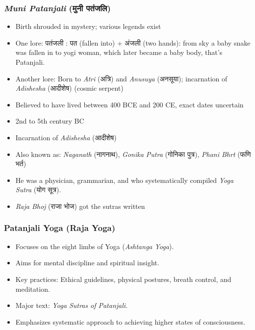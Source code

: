 \begin{frame}[fragile]\frametitle{\textit{Muni Patanjali} (मुनी पतंजलि)}

    \begin{itemize}
        \item Birth shrouded in mystery; various legends exist
		\item One lore: पतंजली : पत (fallen into) + अंजली (two hands): from sky a baby snake was fallen in to yogi woman, which later became a baby body, that's Patanjali.
        \item Another lore: Born to \textit{Atri} (अत्रि) and \textit{Anusuya} (अनसूया); incarnation of \textit{Adishesha} (आदीशेष) (cosmic serpent)
        \item Believed to have lived between 400 BCE and 200 CE, exact dates uncertain
        \item 2nd to 5th century BC
        \item Incarnation of \textit{Adishesha} (आदीशेष)
        \item Also known as: \textit{Naganath} (नागनाथ), \textit{Gonika Putra} (गोनिका पुत्र), \textit{Phani Bhrt} (फणि भर्त)
        \item He was a physician, grammarian, and who systematically compiled \textit{Yoga Sutra} (योग सूत्र).
        \item \textit{Raja Bhoj} (राजा भोज) got the sutras written
    \end{itemize}

\end{frame}

\begin{frame}[fragile]\frametitle{Patanjali Yoga (Raja Yoga)}

      \begin{itemize}
		\item Focuses on the eight limbs of Yoga (\textit{Ashtanga Yoga}).
		\item Aims for mental discipline and spiritual insight.
		\item Key practices: Ethical guidelines, physical postures, breath control, and meditation.
		\item Major text: \textit{Yoga Sutras of Patanjali}.
		\item Emphasizes systematic approach to achieving higher states of consciousness.
	  \end{itemize}

\end{frame}

